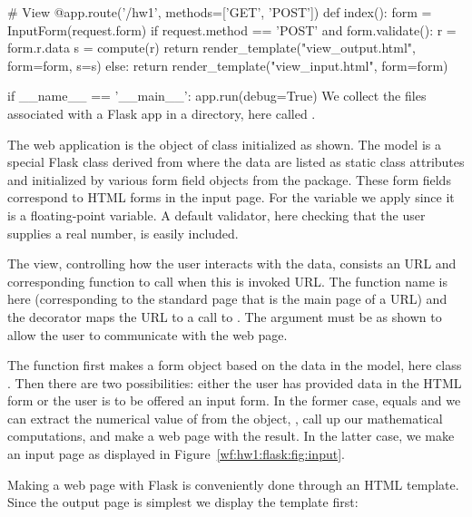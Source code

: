 \documentclass[%
oneside,                 %
final,                   %
10pt]{article}
\begin{document}
# View
@app.route('/hw1', methods=['GET', 'POST'])
def index():
    form = InputForm(request.form)
    if request.method == 'POST' and form.validate():
        r = form.r.data
        s = compute(r)
        return render_template("view_output.html", form=form, s=s)
    else:
        return render_template("view_input.html", form=form)

if __name__ == '__main__':
    app.run(debug=True)
\epypro
We collect the files associated with a Flask app in a directory,
here called .

The web application is the  object of class  initialized
as shown. The model is a special Flask class derived from 
where the data are listed as static class attributes and initialized
by various form field objects from the  package.
These form fields correspond to HTML forms in the input page.
For the  variable we apply  since it is a floating-point
variable. A default validator, here checking that the user supplies
a real number, is easily included.

The view, controlling how the user interacts with the data, consists
an URL and corresponding function to call when this is invoked URL.
The function name is here  (corresponding to the standard
 page that is the main page of a URL) and the
decorator  maps the URL
 to a call to .
The  argument must be as shown to allow the user to communicate
with the web page.


The  function first makes a form object based on the data in
the model, here class . Then there are two possibilities:
either the user has provided data in the HTML form or the user is
to be offered an input form. In the former case, 
equals  and we can extract the numerical value of 
from the  object, , call up our mathematical
computations, and make a web page with the result.
In the latter case, we make an input page as displayed in
Figure~\ref{wf:hw1:flask:fig:input}.


Making a web page with Flask is conveniently done through an HTML
template. Since the output page is simplest we display the
 template first:
\end{document}
